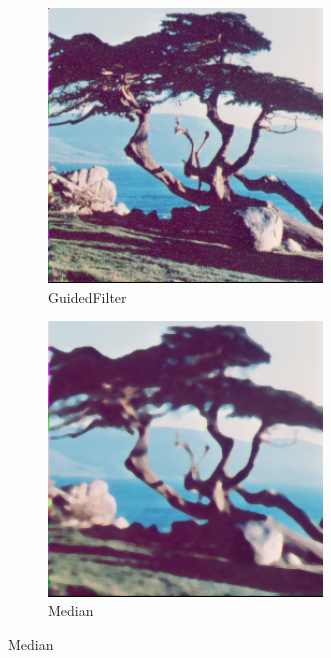 \documentclass[12pt]{article}
\begin{document}
\begin{figure}
		\begin{subfigure}{0.4\textwidth}
			\centering
			\includegraphics[width=0.8\textwidth]{tree/treetiffGuidedFilter.png}
			\caption{GuidedFilter}
		\end{subfigure}
		\begin{subfigure}{0.4\textwidth}
			\centering
			\includegraphics[width=0.8\textwidth]{tree/treetiffMedianFilter.png}
			\caption{Median}
		\end{subfigure}
	

\end{figure}
\end{document}
